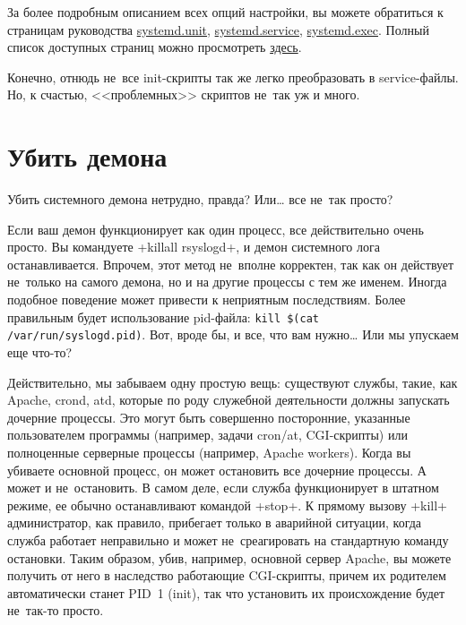 \documentclass[10pt,oneside,a4paper]{article}
\begin{document}
За более подробным описанием всех опций настройки, вы можете обратиться к
страницам руководства
\href{http://www.freedesktop.org/software/systemd/man/systemd.unit.html}{systemd.unit},
\href{http://www.freedesktop.org/software/systemd/man/systemd.service.html}{systemd.service},
\href{http://www.freedesktop.org/software/systemd/man/systemd.exec.html}{systemd.exec}.
Полный список доступных страниц можно просмотреть
\href{http://www.freedesktop.org/software/systemd/man/}{здесь}.

Конечно, отнюдь не~все init-скрипты так же легко преобразовать в
service-файлы. Но, к счастью, <<проблемных>> скриптов не~так уж и много. 

\section{Убить демона}

Убить системного демона нетрудно, правда? Или\ldots{} все не~так просто?

Если ваш демон функционирует как один процесс, все действительно очень просто.
Вы командуете +killall rsyslogd+, и демон системного лога останавливается.
Впрочем, этот метод не~вполне корректен, так как он действует не~только на
самого демона, но и на другие процессы с тем же именем. Иногда подобное
поведение может привести к неприятным последствиям. Более правильным будет
использование pid-файла: \verb+kill $(cat /var/run/syslogd.pid)+. Вот, вроде
бы, и все, что вам нужно\ldots{} Или мы упускаем еще что-то?

Действительно, мы забываем одну простую вещь: существуют службы, такие, как
Apache, crond, atd, которые по роду служебной деятельности должны запускать
дочерние процессы. Это могут быть совершенно посторонние, указанные
пользователем программы (например, задачи cron/at, CGI-скрипты) или полноценные
серверные процессы (например, Apache workers). Когда вы убиваете основной
процесс, он может остановить все дочерние процессы. А может и не~остановить. В
самом деле, если служба функционирует в штатном режиме, ее обычно останавливают
командой +stop+. К прямому вызову +kill+ администратор, как правило,
прибегает только в аварийной ситуации, когда служба работает неправильно и
может не~среагировать на стандартную команду остановки. Таким образом, убив,
например, основной сервер Apache, вы можете получить от него в наследство
работающие CGI-скрипты, причем их родителем автоматически станет PID~1 (init),
так что установить их происхождение будет не~так-то просто. 
\end{document}
